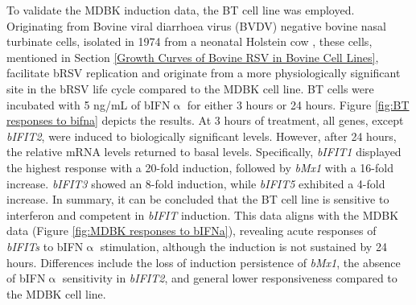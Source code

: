 To validate the MDBK induction data, the BT cell line was employed. Originating from Bovine viral diarrhoea virus (BVDV) negative bovine nasal turbinate cells, isolated in 1974 from a neonatal Holstein cow \cite{McClurkin1974ComparisonVirus.}, these cells, mentioned in Section \ref{Growth Curves of Bovine RSV in Bovine Cell Lines}, facilitate bRSV replication and originate from a more physiologically significant site in the bRSV life cycle compared to the MDBK cell line. BT cells were incubated with 5 ng/mL of bIFN$\upalpha$ for either 3 hours or 24 hours. Figure \ref{fig:BT responses to bifna} depicts the results. At 3 hours of treatment, all genes, except \textit{bIFIT2}, were induced to biologically significant levels. However, after 24 hours, the relative mRNA levels returned to basal levels. Specifically, \textit{bIFIT1} displayed the highest response with a 20-fold induction, followed by \textit{bMx1} with a 16-fold increase. \textit{bIFIT3} showed an 8-fold induction, while \textit{bIFIT5} exhibited a 4-fold increase. In summary, it can be concluded that the BT cell line is sensitive to interferon and competent in \textit{bIFIT} induction. This data aligns with the MDBK data (Figure \ref{fig:MDBK responses to bIFNa}), revealing acute responses of \textit{bIFITs} to bIFN$\upalpha$ stimulation, although the induction is not sustained by 24 hours. Differences include the loss of induction persistence of \textit{bMx1}, the absence of bIFN$\upalpha$ sensitivity in \textit{bIFIT2}, and general lower responsiveness compared to the MDBK cell line.

